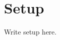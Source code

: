 \documentclass[a4paper,11pt,oneside,openany,fleqn]{jsbook}
\begin{document}
    \chapter{Setup}
    Write setup here.
\end{document}
